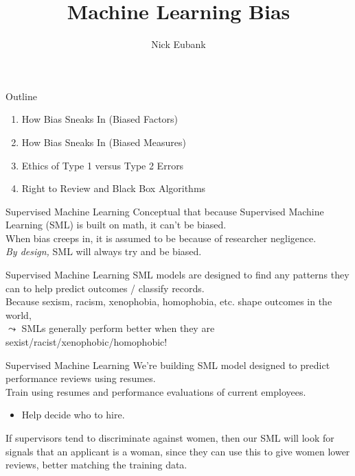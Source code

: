 \documentclass[11pt]{beamer}
\title{Machine Learning Bias}
\author{\small Nick Eubank}
\date{\vspace*{.3in} \date}
\begin{document}
\begin{frame}
\maketitle
\end{frame}

\begin{frame}[c]{Outline}
  \begin{enumerate}
    \item How Bias Sneaks In (Biased Factors)
    \pause \item How Bias Sneaks In (Biased Measures)
    \pause \item Ethics of Type 1 versus Type 2 Errors
    \pause \item Right to Review and Black Box Algorithms
  \end{enumerate}
\end{frame}

\begin{frame}[c]{Supervised Machine Learning}
  Conceptual that because Supervised Machine Learning (SML) is built on math, it can't be biased. \\
  \pause
  \vspace{0.2cm}
  When bias creeps in, it is assumed to be because of researcher negligence. \\
  \vspace{0.2cm}
  \pause \emph{By design,} SML will always try and be biased.
\end{frame}

\begin{frame}[c]{Supervised Machine Learning}
  SML models are designed to find any patterns they can to help predict outcomes / classify records. \\
  \vspace{0.2cm}
  Because sexism, racism, xenophobia, homophobia, etc. shape outcomes in the world, \\
  \vspace{0.2cm}
  $\leadsto$ SMLs generally \alert{perform better} when they are sexist/racist/xenophobic/homophobic!
\end{frame}

\begin{frame}[c]{Supervised Machine Learning}
  We're building SML model designed to predict performance reviews using resumes.\\
  \pause Train using resumes and performance evaluations of current employees.
  \begin{itemize}
    \pause \item Help decide who to hire.
  \end{itemize}
  \pause
  \vspace{0.1cm}
  If supervisors tend to discriminate against women, then our SML will \alert{look for signals that an applicant is a woman}, since they can use this to give women lower reviews, better matching the training data.
\end{frame}
\end{document}
